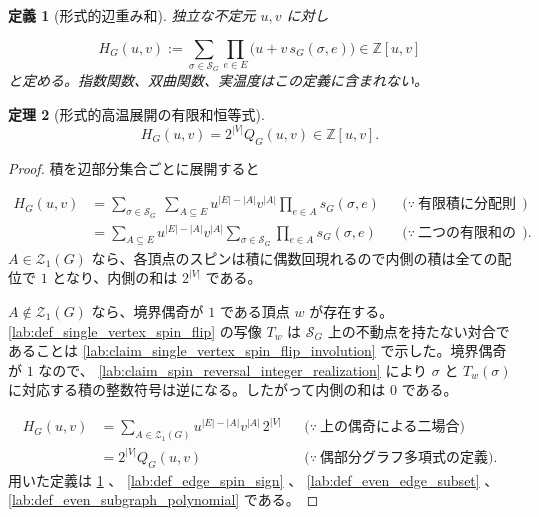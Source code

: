 \documentclass[11pt,a4paper]{article}
\newtheorem{definition}{定義}[section]
\newtheorem{theorem}[definition]{定理}
\theoremstyle{remark}
\begin{document}
\begin{definition}[形式的辺重み和]\label{lab:def_formal_edge_weight_sum}
独立な不定元 
$u,v$
 に対し

\[H_G(u,v):=\sum_{\sigma\in\mathcal S_G}\prod_{e\in E}\bigl(u+v\,s_G(\sigma,e)\bigr)\in\mathbb Z[u,v]\]
と定める。指数関数、双曲関数、実温度はこの定義に含まれない。

\end{definition}

\begin{theorem}[形式的高温展開の有限和恒等式]\label{lab:theorem_formal_high_temperature_expansion}
\[H_G(u,v)=2^{|V|}Q_G(u,v)\in\mathbb Z[u,v].\]
\end{theorem}
\begin{proof}
積を辺部分集合ごとに展開すると

\[\begin{aligned}
H_G(u,v)
&=\sum_{\sigma\in\mathcal S_G}\ \sum_{A\subseteq E}u^{|E|-|A|}v^{|A|}\prod_{e\in A}s_G(\sigma,e)
&&\bigl(\because\ \text{有限積に分配則を適用}\bigr)\\
&=\sum_{A\subseteq E}u^{|E|-|A|}v^{|A|}\sum_{\sigma\in\mathcal S_G}\prod_{e\in A}s_G(\sigma,e)
&&\bigl(\because\ \text{二つの有限和の順序交換}\bigr).
\end{aligned}\]
$A\in\mathcal Z_1(G)$
 なら、各頂点のスピンは積に偶数回現れるので内側の積は全ての配位で 
$1$
 となり、内側の和は 
$2^{|V|}$
 である。

$A\notin\mathcal Z_1(G)$
 なら、境界偶奇が 
$1$
 である頂点 
$w$
 が存在する。
\cref{lab:def_single_vertex_spin_flip}
 の写像 
$T_w$
 は 
$\mathcal S_G$
 上の不動点を持たない対合であることは 
\cref{lab:claim_single_vertex_spin_flip_involution}
 で示した。境界偶奇が 
$1$
 なので、
\cref{lab:claim_spin_reversal_integer_realization}
 により 
$\sigma$
 と 
$T_w(\sigma)$
 に対応する積の整数符号は逆になる。したがって内側の和は 
$0$
 である。

\[\begin{aligned}
H_G(u,v)
&=\sum_{A\in\mathcal Z_1(G)}u^{|E|-|A|}v^{|A|}\,2^{|V|}
&&\bigl(\because\ \text{上の偶奇による二場合}\bigr)\\
&=2^{|V|}Q_G(u,v)
&&\bigl(\because\ \text{偶部分グラフ多項式の定義}\bigr).
\end{aligned}\]
用いた定義は 
\cref{lab:def_formal_edge_weight_sum}
、
\cref{lab:def_edge_spin_sign}
、
\cref{lab:def_even_edge_subset}
、
\cref{lab:def_even_subgraph_polynomial}
 である。

\end{proof}
\end{document}
